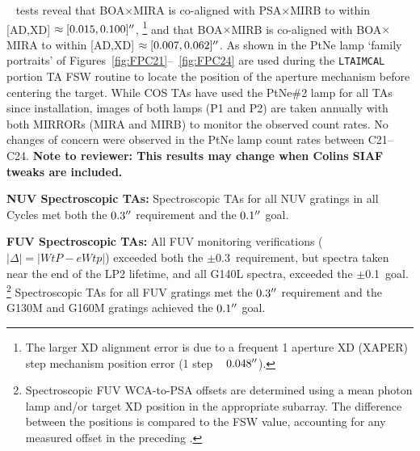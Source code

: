 \begin{description}
	~ tests reveal that BOA$\times$MIRA is co-aligned with PSA$\times$MIRB to within [AD,XD] $\approx [0.015,0.100]\hbox{$^{\prime\prime}$}$,
	\footnote{The larger XD alignment error is due to a frequent 1 aperture XD (XAPER) step mechanism position error (1 step ~ $0.048\hbox{$^{\prime\prime}$}$).}
	and that BOA$\times$MIRB is co-aligned with BOA$\times$MIRA to within [AD,XD] $\approx [0.007,0.062]\hbox{$^{\prime\prime}$}$.
	As shown in the PtNe lamp `family portraits' of Figures~\ref{fig:FPC21}--~\ref{fig:FPC24} are used during the \texttt{LTAIMCAL} portion  TA FSW routine to locate the position of the aperture mechanism before centering the target.
	While COS TAs have used the PtNe\#2 lamp for all TAs since installation, images of both lamps (P1 and P2) are taken annually with both MIRRORs
	(MIRA and MIRB) to monitor the observed count rates. No changes of concern were observed in the PtNe lamp count rates between C21--C24.
	{\bf Note to reviewer: This results may change when Colins SIAF tweaks are included.}
\item{\bf NUV Spectroscopic TAs:}
	Spectroscopic TAs for all NUV gratings in all Cycles met both the $0.3\hbox{$^{\prime\prime}$}$ requirement and the $0.1\hbox{$^{\prime\prime}$}$ goal.
\item{\bf FUV Spectroscopic TAs:}
All FUV monitoring verifications ($|\Delta| = |WtP-eWtp|$) exceeded both the $\pm$0.3\arcsec\ requirement,
but spectra taken near the end of the LP2 lifetime, and all G140L spectra, exceeded the $\pm$0.1\arcsec\ goal.
\footnote{Spectroscopic FUV WCA-to-PSA offsets are determined using a mean photon lamp and/or target XD position in the appropriate subarray.
	The difference between the positions is compared to the FSW value, accounting for any measured offset in the preceding .}
	Spectroscopic TAs for all FUV gratings met the $0.3\hbox{$^{\prime\prime}$}$ requirement and the G130M and G160M gratings achieved the $0.1\hbox{$^{\prime\prime}$}$ goal.
\end{description}
